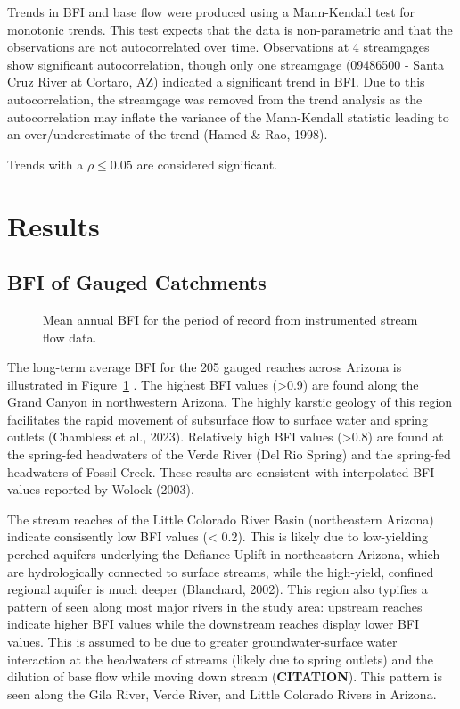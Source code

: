 \documentclass[
]{agujournal2019}
\begin{document}
Trends in BFI and base flow were produced using a Mann-Kendall test for
monotonic trends. This test expects that the data is non-parametric and
that the observations are not autocorrelated over time. Observations at
4 streamgages show significant autocorrelation, though only one
streamgage (09486500 - Santa Cruz River at Cortaro, AZ) indicated a
significant trend in BFI. Due to this autocorrelation, the streamgage
was removed from the trend analysis as the autocorrelation may inflate
the variance of the Mann-Kendall statistic leading to an
over/underestimate of the trend (Hamed \& Rao, 1998).

Trends with a \(\rho \le 0.05\) are considered significant.

\section{Results}\label{results}

\subsection{BFI of Gauged Catchments}\label{bfi-of-gauged-catchments}

\begin{figure}


\caption{\label{fig-instrumented-bfi}Mean annual BFI for the period of
record from instrumented stream flow data.}

\end{figure}%

The long-term average BFI for the 205 gauged reaches across Arizona is
illustrated in Figure~\ref{fig-instrumented-bfi} . The highest BFI
values (\textgreater0.9) are found along the Grand Canyon in
northwestern Arizona. The highly karstic geology of this region
facilitates the rapid movement of subsurface flow to surface water and
spring outlets (Chambless et al., 2023). Relatively high BFI values
(\textgreater0.8) are found at the spring-fed headwaters of the Verde
River (Del Rio Spring) and the spring-fed headwaters of Fossil Creek.
These results are consistent with interpolated BFI values reported by
Wolock (2003).

The stream reaches of the Little Colorado River Basin (northeastern
Arizona) indicate consisently low BFI values (\textless{} 0.2). This is
likely due to low-yielding perched aquifers underlying the Defiance
Uplift in northeastern Arizona, which are hydrologically connected to
surface streams, while the high-yield, confined regional aquifer is much
deeper (Blanchard, 2002). This region also typifies a pattern of seen
along most major rivers in the study area: upstream reaches indicate
higher BFI values while the downstream reaches display lower BFI values.
This is assumed to be due to greater groundwater-surface water
interaction at the headwaters of streams (likely due to spring outlets)
and the dilution of base flow while moving down stream
(\textbf{CITATION}). This pattern is seen along the Gila River, Verde
River, and Little Colorado Rivers in Arizona.
\end{document}
